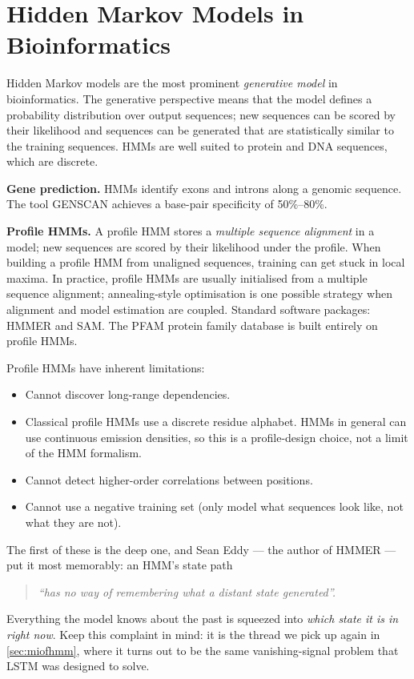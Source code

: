 \documentclass[11pt, oneside]{book}
\begin{document}
\section{Hidden Markov Models in Bioinformatics}
\label{sec:hmm-bioinformatics}

Hidden Markov models are the most prominent \emph{generative model} in bioinformatics.
The generative perspective means that the model defines a probability distribution over
output sequences; new sequences can be scored by their likelihood and sequences
can be generated that are statistically similar to the training sequences.
HMMs are well suited to protein and DNA sequences, which are discrete.

\textbf{Gene prediction.}
HMMs identify exons and introns along a genomic sequence.
The tool GENSCAN achieves a base-pair specificity of 50\%–80\%.

\textbf{Profile HMMs.}
A profile HMM stores a \emph{multiple sequence alignment} in a model;
new sequences are scored by their likelihood under the profile.
When building a profile HMM from unaligned sequences, training can get stuck in local
maxima. In practice, profile HMMs are usually initialised from a multiple sequence
alignment; annealing-style optimisation is one possible strategy when alignment and
model estimation are coupled.
Standard software packages: HMMER and SAM.
The PFAM protein family database is built entirely on profile HMMs.

Profile HMMs have inherent limitations:
\begin{itemize}
  \item Cannot discover long-range dependencies.
  \item Classical profile HMMs use a discrete residue alphabet. HMMs in general can use
        continuous emission densities, so this is a profile-design choice, not a limit of
        the HMM formalism.
  \item Cannot detect higher-order correlations between positions.
  \item Cannot use a negative training set (only model what sequences look like, not what they are not).
\end{itemize}

The first of these is the deep one, and Sean Eddy --- the author of HMMER --- put
it most memorably: an HMM's state path
\begin{quote}
\emph{``has no way of remembering what a distant state generated''.}
\end{quote}
Everything the model knows about the past is squeezed into \emph{which state it is
in right now}.
Keep this complaint in mind: it is the thread we pick up again in
\cref{sec:miofhmm}, where it turns out to be the same vanishing-signal problem
that LSTM was designed to solve.
\end{document}
